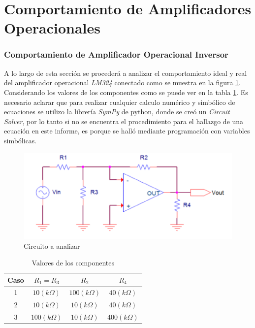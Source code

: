 \part{Comportamiento de Amplificadores Operacionales}

\section{Comportamiento de Amplificador Operacional Inversor}

A lo largo de esta sección se procederá a analizar el comportamiento
ideal y real del amplificador operacional \emph{LM324 }conectado como
se muestra en la figura \ref{1_a_1}. Considerando los valores de
los componentes como se puede ver en la tabla \ref{1_a_t_1}. Es necesario
aclarar que para realizar cualquier calculo numérico y simbólico de
ecuaciones se utilizo la librería \emph{SymPy }de python, donde se
creó un \emph{Circuit Solver}, por lo tanto si no se encuentra el
procedimiento para el hallazgo de una ecuación en este informe, es
porque se halló mediante programación con variables simbólicas.

\begin{figure}[H]
\begin{centering}
\includegraphics[scale=0.75]{../Ex1/iA/Resources1a/Circuito1a}
\par\end{centering}
\caption{Circuito a analizar}
\label{1_a_1}
\end{figure}

\begin{table}[H]
\begin{centering}
\begin{tabular}{|c|c|c|c|}
\hline 
Caso & $R_{1}=R_{3}$ & $R_{2}$ & $R_{4}$\tabularnewline
\hline 
\hline 
1 & $10\left(k\Omega\right)$ & $100\left(k\Omega\right)$ & $40\left(k\Omega\right)$\tabularnewline
\hline 
2 & $10\left(k\Omega\right)$ & $10\left(k\Omega\right)$ & $40\left(k\Omega\right)$\tabularnewline
\hline 
3 & $100\left(k\Omega\right)$ & $10\left(k\Omega\right)$ & $400\left(k\Omega\right)$\tabularnewline
\hline 
\end{tabular}
\par\end{centering}
\caption{Valores de los componentes}
\label{1_a_t_1}

\end{table}

